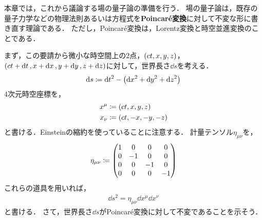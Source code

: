 \documentclass{report}
\begin{document}
  本章では，これから議論する場の量子論の準備を行う．
  場の量子論は，既存の量子力学などの物理法則あるいは方程式を\textbf{Poincar\'e変換}に対して不変な形に書き直す理論である．
  ただし，Poincar\'e変換は，Lorentz変換と時空並進変換のことである．
  \par
  まず，この要請から微小な時空間上の2点，$\qty(ct, x, y, z)$，$\qty(ct + \dd{t}, x + \dd{x}, y + \dd{y}, z + \dd{z})$に対して，世界長さ$\dd{s}$を考える．
  \begin{align}
    \dd{s} \coloneqq \dd{t}^2 - \qty(\dd{x}^2 + \dd{y}^2 + \dd{z}^2)
  \end{align}
  4次元時空座標を，
  \begin{align}
    x^{\mu} &\coloneqq \qty(ct, x, y, z) \\ 
    x_{\nu} &\coloneqq \qty(ct, -x, -y, -z)
  \end{align}
  と書ける．Einsteinの縮約を使っていることに注意する．
  計量テンソル$\eta_{\mu\nu}$を，
  \begin{align}
    \eta_{\mu\nu} \coloneqq \mqty(
      1 & 0 & 0 & 0 \\ 
      0 & -1 & 0 & 0 \\ 
      0 & 0 & -1 & 0 \\ 
      0 & 0 & 0 & -1
    )
  \end{align}
  これらの道具を用いれば，
  \begin{align}
    \dd{s^2} = \eta_{\mu\nu}\dd{x^{\mu}}\dd{x^{\nu}}
  \end{align}
  と書ける．
  さて，世界長さ$\dd{s}$がPoincar\'e変換に対して不変であることを示そう．
\end{document}
